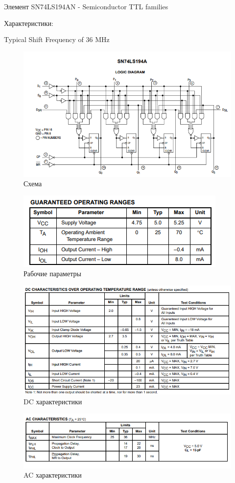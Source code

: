 Элемент SN74LS194AN - Semiconductor TTL families

Характеристики:

Typical Shift Frequency of 36 MHz

\begin{figure}[H]
	\centering
	\includegraphics[width=0.95\linewidth]{imgs/11/11_sh}
	\caption{Схема}
	\label{fig:11_sh}
\end{figure}

\begin{figure}[H]
	\centering
	\includegraphics[width=0.8\linewidth]{imgs/11/11_guar}
	\caption{Рабочие параметры}
	\label{fig:11_guar}
\end{figure}

\begin{figure}[H]
	\centering
	\includegraphics[width=0.95\linewidth]{imgs/11/11_dc}
	\caption{DC характеристики}
	\label{fig:11_dc}
\end{figure}

\begin{figure}[H]
	\centering
	\includegraphics[width=0.95\linewidth]{imgs/11/11_ac_ch}
	\caption{AC характеристики}
	\label{fig:10_timing}
\end{figure}
